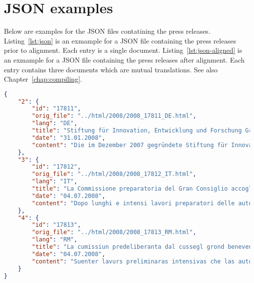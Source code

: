 \chapter{JSON examples}\label{appendix-b}
Below are examples for the \acrshort{JSON} files contatining the press releases. 
Listing~\ref{lst:json} is an exmample for a JSON file containing the press releases prior to alignment. 
Each entry is a single document.
Listing~\ref{lst:json-aligned} is an exmample for a JSON file containing the press releases after alignment. 
Each entry contains three documents which are mutual translations.
See also Chapter~\ref{chap:compiling}.


\begin{lstlisting}[caption={Example for a JSON file containing the press releases extracted from the HTML files.}, captionpos=b, label=lst:json, language=json]
{
    "2": {
        "id": "17811",
        "orig_file": "../html/2008/2008_17811_DE.html",
        "lang": "DE",
        "title": "Stiftung für Innovation, Entwicklung und Forschung Graubünden nimmt ihre Tätigkeit auf",
        "date": "31.01.2008",
        "content": "Die im Dezember 2007 gegründete Stiftung für Innovation, Entwicklung  und Forschung Graubünden hat ihre Tätigkeit im Januar 2008 aufgenommen.  ..."
    },
    "3": {
        "id": "17812",
        "orig_file": "../html/2008/2008_17812_IT.html",
        "lang": "IT",
        "title": "La Commissione preparatoria del Gran Consiglio accoglie con favore l'aggregazione dei Comuni di Feldis, Scheid, Trans e Tomils nel Comune di Tomils",
        "date": "04.07.2008",
        "content": "Dopo lunghi e intensi lavori preparatori delle autorità dei Comuni  interessati, il 13 dicembre 2007 gli aventi diritto di voto di tutti e  quattro i Comuni di Feldis/Veulden, Scheid, Trans e Tumegl/Tomils hanno  accolto a larga maggioranza la convenzione sulla nuova aggregazione nel  Comune di Tomils.  ..."
    },
    "4": {
        "id": "17813",
        "orig_file": "../html/2008/2008_17813_RM.html",
        "lang": "RM",
        "title": "La cumissiun predeliberanta dal cussegl grond beneventa la fusiun da las vischnancas da Veulden, da Sched, da Tràn e da Tumegl a la vischnanca da Tumegl",
        "date": "04.07.2008",
        "content": "Suenter lavurs preliminaras intensivas che las autoritads da las  vischnancas pertutgadas han prestà durant divers onns han las votantas  ed ils votants da tut las quatter vischnancas da Veulden, da Sched, da  Tràn e da Tumegl acceptà ils 13 da december 2007 cun gronda maioritad en  tut las vischnancas la cunvegna da fusiun a la nova vischnanca da  Tumegl.  ..."
    }
}
\end{lstlisting}

